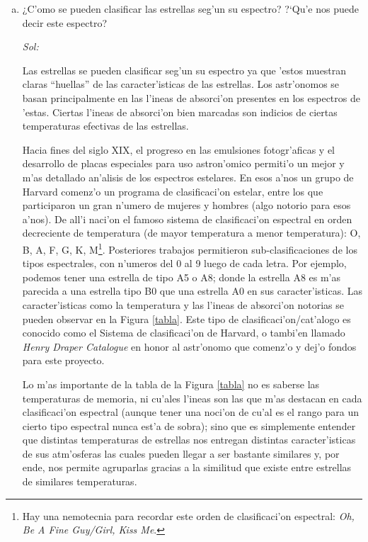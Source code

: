 \documentclass{article}
\begin{document}
\begin{enumerate}[a)] 


\item ¿C'omo se pueden clasificar las estrellas seg'un su espectro? ?`Qu'e nos puede decir este espectro?

\vspace{2mm}

\emph{Sol:}

\vspace{2mm}

Las estrellas se pueden clasificar seg'un su espectro ya que 'estos muestran claras ``huellas'' de las caracter'isticas de las estrellas. Los astr'onomos se basan principalmente en las l'ineas de absorci'on presentes en los espectros de 'estas. Ciertas l'ineas de absorci'on bien marcadas son indicios de ciertas temperaturas efectivas de las estrellas.

Hacia fines del siglo XIX, el progreso en las emulsiones fotogr'aficas y el desarrollo de placas especiales para uso astron'omico permiti'o un mejor y m'as detallado an'alisis de los espectros estelares. En esos a'nos un grupo de Harvard comenz'o un programa de clasificaci'on estelar, entre los que participaron un gran n'umero de mujeres y hombres (algo notorio para esos a'nos). De all'i naci'on el famoso sistema de clasificaci'on espectral en orden decreciente de temperatura (de mayor temperatura a menor temperatura): O, B, A, F, G, K, M\footnote{Hay una nemotecnia para recordar este orden de clasificaci'on espectral: \emph{Oh, Be A Fine Guy/Girl, Kiss Me}.}. Posteriores trabajos permitieron sub-clasificaciones de los tipos espectrales, con n'umeros del 0 al 9 luego de cada letra. Por ejemplo, podemos tener una estrella de tipo A5 o A8; donde la estrella A8 es m'as parecida a una estrella tipo B0 que una estrella A0 en sus caracter'isticas. Las caracter'isticas como la temperatura y las l'ineas de absorci'on notorias se pueden observar en la Figura \ref{tabla}. Este tipo de clasificaci'on/cat'alogo es conocido como el Sistema de clasificaci'on de Harvard, o tambi'en llamado \emph{Henry Draper Catalogue} en honor al astr'onomo que comenz'o y dej'o fondos para este proyecto.

Lo m'as importante de la tabla de la Figura \ref{tabla} no es saberse las temperaturas de memoria, ni cu'ales l'ineas son las que m'as destacan en cada clasificaci'on espectral (aunque tener una noci'on de cu'al es el rango para un cierto tipo espectral nunca est'a de sobra); sino que es simplemente entender que distintas temperaturas de estrellas nos entregan distintas caracter'isticas de sus atm'osferas las cuales pueden llegar a ser bastante similares y, por ende, nos permite agruparlas gracias a la similitud que existe entre estrellas de similares temperaturas.



\end{enumerate}
\end{document}
